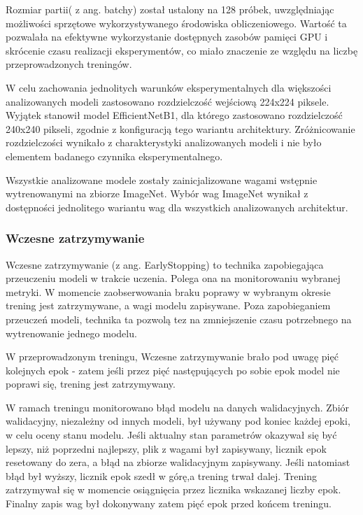 Rozmiar partii( z ang. batchy) został ustalony na 128 próbek, uwzględniając możliwości sprzętowe wykorzystywanego środowiska obliczeniowego. Wartość ta pozwalała na efektywne wykorzystanie dostępnych zasobów pamięci GPU i skrócenie czasu realizacji eksperymentów, co miało znaczenie ze względu na liczbę przeprowadzonych treningów. 

W celu zachowania jednolitych warunków eksperymentalnych dla większości analizowanych modeli zastosowano rozdzielczość wejściową 224x224 piksele. Wyjątek stanowił model EfficientNetB1, dla którego zastosowano rozdzielczość 240x240 pikseli, zgodnie \newline z konfiguracją tego wariantu architektury. Zróżnicowanie rozdzielczości wynikało z charakterystyki analizowanych modeli i nie było elementem badanego czynnika eksperymentalnego.

Wszystkie analizowane modele zostały zainicjalizowane wagami wstępnie wytrenowanymi na zbiorze ImageNet. Wybór wag ImageNet wynikał z dostępności jednolitego wariantu wag dla wszystkich analizowanych architektur. 

\subsubsection{Wczesne zatrzymywanie}
Wczesne zatrzymywanie (z ang. EarlyStopping) to technika zapobiegająca przeuczeniu modeli w trakcie uczenia. Polega ona na monitorowaniu wybranej metryki. W momencie zaobserwowania braku poprawy w wybranym okresie trening jest zatrzymywane, a wagi modelu zapisywane. Poza zapobieganiem przeuczeń modeli, technika ta pozwolą tez na zmniejszenie czasu potrzebnego na wytrenowanie jednego modelu.

W przeprowadzonym treningu, Wczesne zatrzymywanie brało pod uwagę pięć kolejnych epok - zatem jeśli przez pięć następujących po sobie epok model nie poprawi się, trening jest zatrzymywany.

W ramach treningu monitorowano błąd modelu na danych walidacyjnych. Zbiór walidacyjny, niezależny od innych modeli, był używany pod koniec każdej epoki, w celu oceny stanu modelu. Jeśli aktualny stan parametrów okazywał się być lepszy, niż poprzedni najlepszy, plik z wagami był zapisywany, licznik epok resetowany do zera, a błąd na zbiorze walidacyjnym zapisywany. Jeśli natomiast błąd był wyższy, licznik epok szedł w górę,a trening trwał dalej. Trening zatrzymywał się w momencie osiągnięcia przez licznika wskazanej liczby epok. Finalny zapis wag był dokonywany zatem pięć epok przed końcem treningu.

